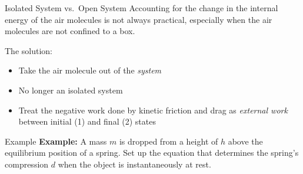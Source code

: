 \documentclass[12pt,compress,aspectratio=169]{beamer}
\begin{document}
\begin{frame}{Isolated System vs.\ Open System}
  Accounting for the change in the internal energy of the air molecules is not
  always practical, especially when the air molecules are not confined to a box.
  \begin{center}
  \end{center}
  \vspace{-.05in}The solution:
  \begin{itemize}
  \item Take the air molecule out of the \emph{system}
  \item No longer an isolated system
  \item Treat the negative work done by kinetic friction and drag as
    \emph{external work} between initial (1) and final (2) states

  \end{itemize}
\end{frame}

%
%  
%    



\begin{frame}{Example}
  \textbf{Example:} A mass $m$ is dropped from a height of $h$ above the
  equilibrium position of a spring. Set up the equation that determines the
  spring's compression $d$ when the object is instantaneously at rest.
  \begin{center}
  \end{center}
\end{frame}
\end{document}
